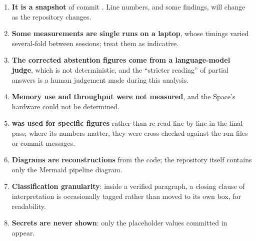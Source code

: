 \begin{enumerate}
  \item \textbf{It is a snapshot} of commit . Line numbers, and some findings, will change as the repository changes.
  \item \textbf{Some measurements are single runs on a laptop}, whose timings varied several-fold between sessions; treat them as indicative.
  \item \textbf{The corrected abstention figures come from a language-model judge}, which is not deterministic, and the \enquote{stricter reading} of partial answers is a human judgement made during this analysis.
  \item \textbf{Memory use and throughput were not measured}, and the Space's hardware could not be determined.
  \item \textbf{ was used for specific figures} rather than re-read line by line in the final pass; where its numbers matter, they were cross-checked against the run files or commit messages.
  \item \textbf{Diagrams are reconstructions} from the code; the repository itself contains only the Mermaid pipeline diagram.
  \item \textbf{Classification granularity}: inside a verified paragraph, a closing clause of interpretation is occasionally tagged rather than moved to its own box, for readability.
  \item \textbf{Secrets are never shown}: only the placeholder values committed in  appear.
\end{enumerate}
